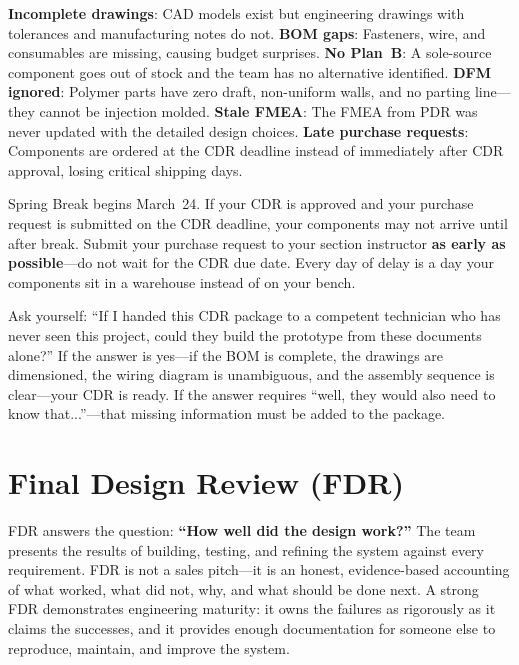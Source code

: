 \documentclass[11pt,letterpaper,twoside,openany]{book}
\begin{document}
\begin{warningbox}
\textbf{Incomplete drawings}: CAD models exist but engineering drawings with tolerances and manufacturing notes do not. \textbf{BOM gaps}: Fasteners, wire, and consumables are missing, causing budget surprises. \textbf{No Plan~B}: A sole-source component goes out of stock and the team has no alternative identified. \textbf{DFM ignored}: Polymer parts have zero draft, non-uniform walls, and no parting line---they cannot be injection molded. \textbf{Stale FMEA}: The FMEA from PDR was never updated with the detailed design choices. \textbf{Late purchase requests}: Components are ordered at the CDR deadline instead of immediately after CDR approval, losing critical shipping days.
\end{warningbox}

\begin{warningbox}
Spring Break begins March~24. If your CDR is approved and your purchase request is submitted on the CDR deadline, your components may not arrive until after break. Submit your purchase request to your section instructor \textbf{as early as possible}---do not wait for the CDR due date. Every day of delay is a day your components sit in a warehouse instead of on your bench.
\end{warningbox}

\begin{tipbox}
Ask yourself: ``If I handed this CDR package to a competent technician who has never seen this project, could they build the prototype from these documents alone?'' If the answer is yes---if the BOM is complete, the drawings are dimensioned, the wiring diagram is unambiguous, and the assembly sequence is clear---your CDR is ready. If the answer requires ``well, they would also need to know that...''---that missing information must be added to the package.
\end{tipbox}


\FloatBarrier
\chapter{Final Design Review (FDR)}

\vspace{1em}

\begin{keyconceptbox}
FDR answers the question: \textbf{``How well did the design work?''} The team presents the results of building, testing, and refining the system against every requirement. FDR is not a sales pitch---it is an honest, evidence-based accounting of what worked, what did not, why, and what should be done next. A strong FDR demonstrates engineering maturity: it owns the failures as rigorously as it claims the successes, and it provides enough documentation for someone else to reproduce, maintain, and improve the system.
\end{keyconceptbox}
\end{document}

